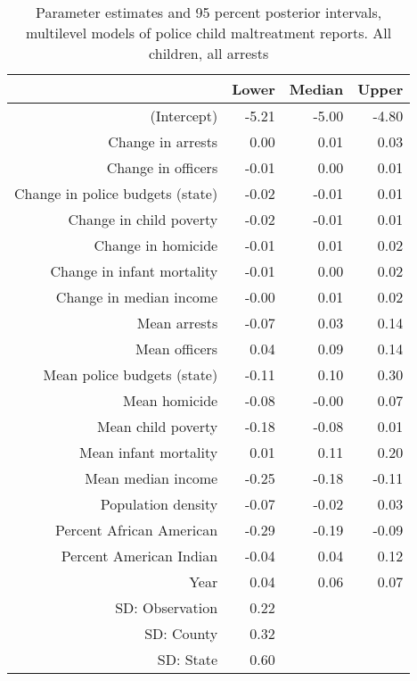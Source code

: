 \begin{table}[ht]
\centering
\caption{Parameter estimates and 95 percent posterior intervals, multilevel models of 
             police child maltreatment reports. All children, all arrests} 
\begin{tabular}{rrrr}
  \hline
 & Lower & Median & Upper \\ 
  \hline
(Intercept) & -5.21 & -5.00 & -4.80 \\ 
  Change in arrests & 0.00 & 0.01 & 0.03 \\ 
  Change in officers & -0.01 & 0.00 & 0.01 \\ 
  Change in police budgets (state) & -0.02 & -0.01 & 0.01 \\ 
  Change in child poverty & -0.02 & -0.01 & 0.01 \\ 
  Change in homicide & -0.01 & 0.01 & 0.02 \\ 
  Change in infant mortality & -0.01 & 0.00 & 0.02 \\ 
  Change in median income & -0.00 & 0.01 & 0.02 \\ 
  Mean arrests & -0.07 & 0.03 & 0.14 \\ 
  Mean officers & 0.04 & 0.09 & 0.14 \\ 
  Mean police budgets (state) & -0.11 & 0.10 & 0.30 \\ 
  Mean homicide & -0.08 & -0.00 & 0.07 \\ 
  Mean child poverty & -0.18 & -0.08 & 0.01 \\ 
  Mean infant mortality & 0.01 & 0.11 & 0.20 \\ 
  Mean median income & -0.25 & -0.18 & -0.11 \\ 
  Population density & -0.07 & -0.02 & 0.03 \\ 
  Percent African American & -0.29 & -0.19 & -0.09 \\ 
  Percent American Indian & -0.04 & 0.04 & 0.12 \\ 
  Year & 0.04 & 0.06 & 0.07 \\ 
  SD: Observation & 0.22 &  &  \\ 
  SD: County & 0.32 &  &  \\ 
  SD: State & 0.60 &  &  \\ 
   \hline
\end{tabular}
\end{table}
